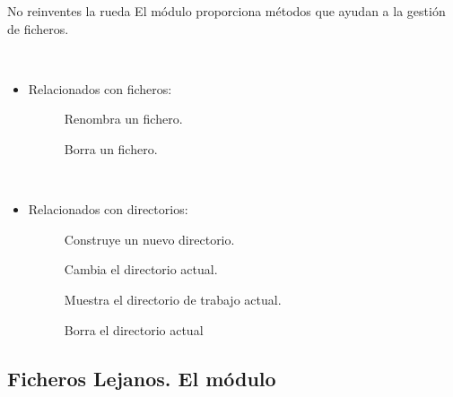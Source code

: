 \documentclass[10pt, envcountsect , spanish]{beamer}
\begin{document}
\begin{frame}[fragile]{No reinventes la rueda} 
\hskip -0.5cm El módulo  proporciona métodos que ayudan a la gestión de ficheros.

\

\begin{itemize}
\item Relacionados con ficheros:
\begin{description}
\item[] Renombra un fichero.
\item[] Borra un fichero.
\end{description}

\

\item Relacionados con directorios:
\begin{description}
\item[]  Construye un nuevo directorio.
\item[] Cambia el directorio actual.
\item[] Muestra el directorio de trabajo actual.
\item[] Borra el directorio actual
\end{description}
\end{itemize}

\end{frame}



\subsection{Ficheros Lejanos. El módulo }
\end{document}
